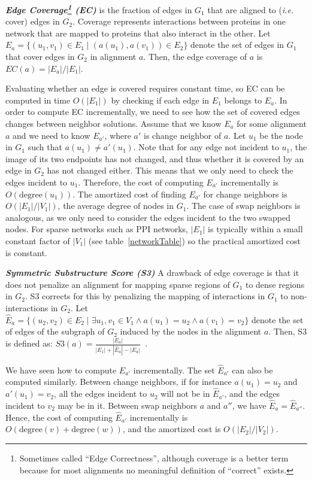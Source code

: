 \documentclass{bioinfo}
\newcommand{\Eb}{\hat{E}}
\begin{document}
\begin{methods}
\emph{\textbf{Edge Coverage\footnote{Sometimes called ``Edge Correctness'', although coverage is a better term because for most alignments no meaningful definition of ``correct'' exists.} (EC)}} is the fraction of edges in $G_1$ that are aligned to ({\it i.e.} cover) edges in $G_2$. Coverage represents interactions between proteins in one network that are mapped to proteins that also interact in the other. Let $E_a=\{(u_1,v_1)\in E_1\mid (a(u_1),a(v_1))\in E_2\}$ denote the set of edges in $G_1$ that cover edges in $G_2$ in alignment $a$. Then, the edge coverage of $a$ is $EC(a)={|E_a|}/{|E_1|}$. 

Evaluating whether an edge is covered requires constant time, so EC can be computed in time $O(|E_1|)$ by checking if each edge in $E_1$ belongs to $E_a$. In order to compute EC incrementally, we need to see how the set of covered edges changes between neighbor solutions. Assume that we know $E_a$ for some alignment $a$ and we need to know $E_{a'}$, where $a'$ is change neighbor of $a$. Let $u_1$ be the node in $G_1$ such that $a(u_1)\not= a'(u_1)$. Note that for any edge not incident to $u_1$, the image of its two endpoints has not changed, and thus whether it is covered by an edge in $G_2$ has not changed either. This means that we only need to check the edges incident to $u_1$. Therefore, the cost of computing $E_{a'}$ incrementally is $O(\mbox{degree}(u_1))$. The amortized cost of finding $E_{a'}$ for change neighbors is $O(|E_1|/|V_1|)$, the average degree of nodes in $G_1$. The case of swap neighbors is analogous, as we only need to consider the edges incident to the two swapped nodes. For sparse networks such as PPI networks, $|E_1|$ is typically within a small constant factor of $|V_1|$ (see table~\ref{networkTable}) so the practical amortized cost is constant.

\emph{\textbf{Symmetric Substructure Score (S3)}} A drawback of edge coverage is that it does not penalize an alignment for mapping sparse regions of $G_1$ to dense regions in $G_2$. S3 corrects for this by penalizing the mapping of interactions in $G_1$ to non-interactions in $G_2$. Let $\Eb_a=\{(u_2,v_2)\in E_2 \mid \exists u_1,v_1 \in V_1 \wedge a(u_1)=u_2 \wedge a(v_1)=v_2\}$ denote the set of edges of the subgraph of $G_2$ induced by the nodes in the alignment $a$. Then, S3 is defined as: $S3(a)=\frac{|E_a|}{|E_1|+|\Eb_a|-|E_a|}$~\citep{MAGNA}.

We have seen how to compute $E_{a'}$ incrementally. The set $\Eb_{a'}$ can also be computed similarly. Between change neighbors, if for instance $a(u_1)=u_2$ and $a'(u_1)=v_2$, all the edges incident to $u_2$ will not be in $\Eb_{a'}$, and the edges incident to $v_2$ may be in it. Between swap neighbors $a$ and $a''$, we have $\Eb_{a}=\Eb_{a''}$. Hence, the cost of computing $\Eb_{a'}$ incrementally is $O(\mbox{degree}(v)+\mbox{degree}(w))$, and the amortized cost is $O(|E_2|/|V_2|)$.


\end{methods}
\end{document}
